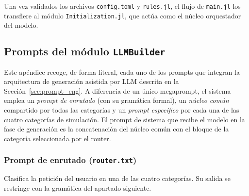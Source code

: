 \documentclass[runningheads]{llncs}
\begin{document}
Una vez validados los archivos \texttt{config.toml} y \texttt{rules.jl}, el flujo de \texttt{main.jl} los transfiere al módulo \texttt{Initialization.jl}, que actúa como el núcleo orquestador del modelo.

\subsection{Prompts del módulo \texttt{LLMBuilder}}
\label{apendice:megaprompt}

Este apéndice recoge, de forma literal, cada uno de los prompts que integran la
arquitectura de generación asistida por LLM descrita en la
Sección~\ref{sec:prompt_eng}. A diferencia de un único megaprompt, el sistema
emplea un \emph{prompt de enrutado} (con su gramática formal), un \emph{núcleo
común} compartido por todas las categorías y un \emph{prompt específico} por
cada una de las cuatro categorías de simulación. El prompt de sistema que recibe
el modelo en la fase de generación es la concatenación del núcleo común con el
bloque de la categoría seleccionada por el router.


\subsubsection{Prompt de enrutado (\texttt{router.txt})}
\label{prompt:router}
Clasifica la petición del usuario en una de las cuatro categorías. Su salida se
restringe con la gramática del apartado siguiente.
\end{document}
